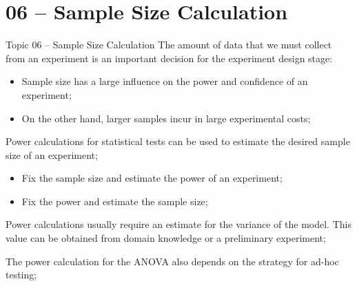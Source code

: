 \section{06 -- Sample Size Calculation}

\begin{frame}[t]{Topic 06 -- Sample Size Calculation}
  The amount of data that we must collect from an experiment is an important
  decision for the experiment design stage:
  \begin{itemize}
    \item Sample size has a large influence on the power and confidence of an experiment;
    \item On the other hand, larger samples incur in large experimental costs;
  \end{itemize}\bigskip

  Power calculations for statistical tests can be used to estimate the desired sample size of an experiment;
  \begin{itemize}
    \item Fix the sample size and estimate the power of an experiment;
    \item Fix the power and estimate the sample size;
  \end{itemize}\bigskip

  Power calculations usually require an estimate for the variance of the model. This value can be obtained from domain knowledge or a preliminary experiment;\bigskip

  The power calculation for the ANOVA also depends on the strategy for ad-hoc testing;
\end{frame}

